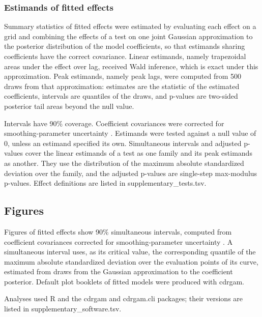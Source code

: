 \subsubsection*{Estimands of fitted effects}

Summary statistics of fitted effects were estimated by evaluating each effect on a grid and combining the effects of a test on one joint Gaussian approximation to the posterior distribution of the model coefficients, so that estimands sharing coefficients have the correct covariance. Linear estimands, namely trapezoidal areas under the effect over lag, received Wald inference, which is exact under this approximation. Peak estimands, namely peak lags, were computed from 500 draws from that approximation: estimates are the statistic of the estimated coefficients, intervals are quantiles of the draws, and p-values are two-sided posterior tail areas beyond the null value.

Intervals have 90\% coverage. Coefficient covariances were corrected for smoothing-parameter uncertainty \citep{wood2016smoothing}. Estimands were tested against a null value of 0, unless an estimand specified its own. Simultaneous intervals and adjusted p-values cover the linear estimands of a test as one family and its peak estimands as another. They use the distribution of the maximum absolute standardized deviation over the family, and the adjusted p-values are single-step max-modulus p-values. Effect definitions are listed in supplementary\_tests.tsv.

\subsection*{Figures}

Figures of fitted effects show 90\% simultaneous intervals, computed from coefficient covariances corrected for smoothing-parameter uncertainty \citep{wood2016smoothing}. A simultaneous interval uses, as its critical value, the corresponding quantile of the maximum absolute standardized deviation over the evaluation points of its curve, estimated from draws from the Gaussian approximation to the coefficient posterior. Default plot booklets of fitted models were produced with cdrgam.

Analyses used R and the cdrgam and cdrgam.cli packages; their versions are listed in supplementary\_software.tsv.

